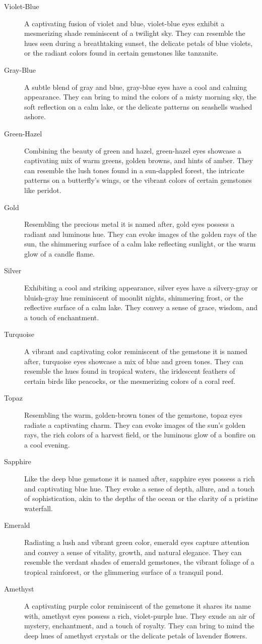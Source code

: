 \documentclass[12pt]{book}  %
\begin{document}
\begin{description}
    \item[Violet-Blue] A captivating fusion of violet and blue, violet-blue eyes exhibit a mesmerizing shade reminiscent of a twilight sky. They can resemble the hues seen during a breathtaking sunset, the delicate petals of blue violets, or the radiant colors found in certain gemstones like tanzanite.
    \item[Gray-Blue] A subtle blend of gray and blue, gray-blue eyes have a cool and calming appearance. They can bring to mind the colors of a misty morning sky, the soft reflection on a calm lake, or the delicate patterns on seashells washed ashore.
    \item[Green-Hazel] Combining the beauty of green and hazel, green-hazel eyes showcase a captivating mix of warm greens, golden browns, and hints of amber. They can resemble the lush tones found in a sun-dappled forest, the intricate patterns on a butterfly's wings, or the vibrant colors of certain gemstones like peridot.
    \item[Gold] Resembling the precious metal it is named after, gold eyes possess a radiant and luminous hue. They can evoke images of the golden rays of the sun, the shimmering surface of a calm lake reflecting sunlight, or the warm glow of a candle flame.
    \item[Silver] Exhibiting a cool and striking appearance, silver eyes have a silvery-gray or bluish-gray hue reminiscent of moonlit nights, shimmering frost, or the reflective surface of a calm lake. They convey a sense of grace, wisdom, and a touch of enchantment.
    \item[Turquoise] A vibrant and captivating color reminiscent of the gemstone it is named after, turquoise eyes showcase a mix of blue and green tones. They can resemble the hues found in tropical waters, the iridescent feathers of certain birds like peacocks, or the mesmerizing colors of a coral reef.
    \item[Topaz] Resembling the warm, golden-brown tones of the gemstone, topaz eyes radiate a captivating charm. They can evoke images of the sun's golden rays, the rich colors of a harvest field, or the luminous glow of a bonfire on a cool evening.
    \item[Sapphire] Like the deep blue gemstone it is named after, sapphire eyes possess a rich and captivating blue hue. They evoke a sense of depth, allure, and a touch of sophistication, akin to the depths of the ocean or the clarity of a pristine waterfall.
    \item[Emerald] Radiating a lush and vibrant green color, emerald eyes capture attention and convey a sense of vitality, growth, and natural elegance. They can resemble the verdant shades of emerald gemstones, the vibrant foliage of a tropical rainforest, or the glimmering surface of a tranquil pond.
    \item[Amethyst] A captivating purple color reminiscent of the gemstone it shares its name with, amethyst eyes possess a rich, violet-purple hue. They exude an air of mystery, enchantment, and a touch of royalty. They can bring to mind the deep hues of amethyst crystals or the delicate petals of lavender flowers.
\end{description}
\end{document}
